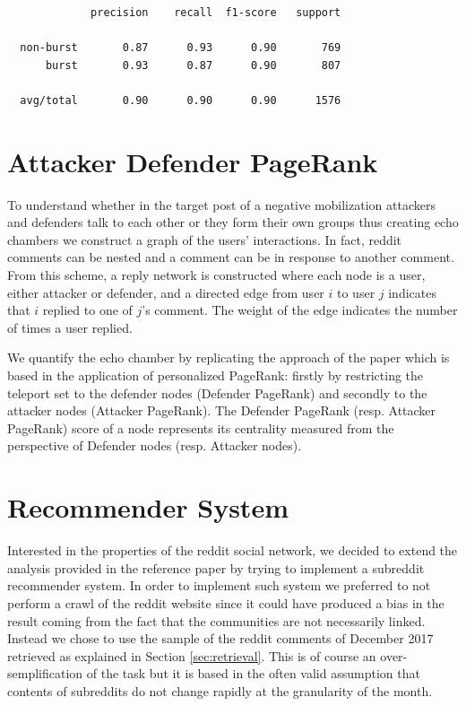 \documentclass{article}
\begin{document}
\begin{verbatim}
             precision    recall  f1-score   support

  non-burst       0.87      0.93      0.90       769
      burst       0.93      0.87      0.90       807

  avg/total       0.90      0.90      0.90      1576
\end{verbatim}

\section{Attacker Defender PageRank}

To understand whether in the target post of a negative mobilization attackers
and defenders talk to each other or they form their own groups thus creating
echo chambers we construct a graph of the users' interactions.
In fact, reddit
comments can be nested and a comment can be in response to another comment.
From this scheme, a reply network is
constructed where each node is a user, either attacker or defender, and a
directed edge from user $i$ to user $j$
indicates that $i$ replied to one of $j$'s comment. The weight of the edge
indicates the number of times a user replied.

We quantify the echo chamber by replicating the approach of the paper which is
based in the application of personalized PageRank: firstly by restricting the
teleport set to the defender nodes (Defender PageRank) and secondly to the
attacker nodes (Attacker PageRank). The Defender PageRank (resp. Attacker
PageRank) score of a node represents its centrality measured from the perspective
of Defender nodes (resp. Attacker nodes).


\section{Recommender System}

Interested in the properties of the reddit social network, we decided to extend
the analysis provided in the reference paper by trying to implement a
subreddit recommender system. In order
to implement such system we preferred to not perform a crawl of the reddit
website since it could have produced a bias in the result coming from the fact
that the communities are not necessarily linked. Instead we chose to use the
sample of the reddit comments of December 2017 retrieved as explained in Section
\ref{sec:retrieval}. This is of course an over-semplification of the task but it
is based in the often valid assumption that contents of subreddits do not change
rapidly at the granularity of the month.
\end{document}
